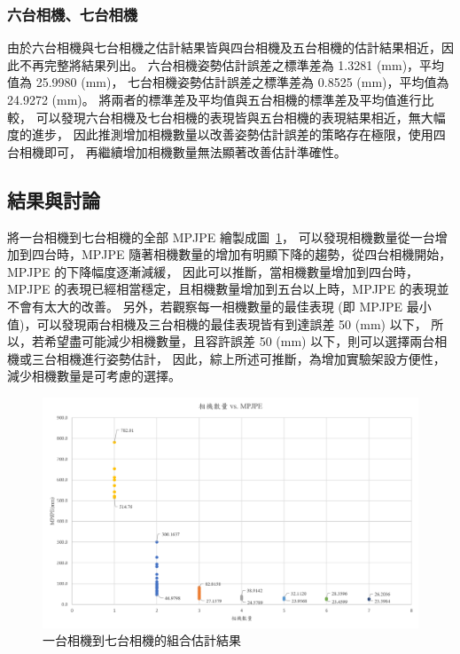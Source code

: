 \subsubsection{六台相機、七台相機}
由於六台相機與七台相機之估計結果皆與四台相機及五台相機的估計結果相近，因此不再完整將結果列出。
六台相機姿勢估計誤差之標準差為 1.3281 (mm)，平均值為 25.9980 (mm)，
七台相機姿勢估計誤差之標準差為 0.8525 (mm)，平均值為 24.9272 (mm)。
將兩者的標準差及平均值與五台相機的標準差及平均值進行比較，
可以發現六台相機及七台相機的表現皆與五台相機的表現結果相近，無大幅度的進步，
因此推測增加相機數量以改善姿勢估計誤差的策略存在極限，使用四台相機即可，
再繼續增加相機數量無法顯著改善估計準確性。

\subsection{結果與討論}
將一台相機到七台相機的全部 MPJPE 繪製成圖~\ref{ch3_fig_1to7cam}，
可以發現相機數量從一台增加到四台時，MPJPE 隨著相機數量的增加有明顯下降的趨勢，從四台相機開始，MPJPE 的下降幅度逐漸減緩，
因此可以推斷，當相機數量增加到四台時，MPJPE 的表現已經相當穩定，且相機數量增加到五台以上時，MPJPE 的表現並不會有太大的改善。
另外，若觀察每一相機數量的最佳表現 (即 MPJPE 最小值)，可以發現兩台相機及三台相機的最佳表現皆有到達誤差 50 (mm) 以下，
所以，若希望盡可能減少相機數量，且容許誤差 50 (mm) 以下，則可以選擇兩台相機或三台相機進行姿勢估計，
因此，綜上所述可推斷，為增加實驗架設方便性，減少相機數量是可考慮的選擇。
\begin{figure}[!ht]
   \centering
   \includegraphics[width=\linewidth]{figure/ch3_fig_1to7cam.png}
   \caption[一台相機到七台相機的組合估計結果]{一台相機到七台相機的組合估計結果}
   \label{ch3_fig_1to7cam}
\end{figure}

